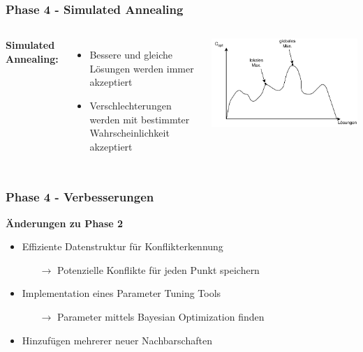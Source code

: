 \documentclass[aspectratio=169]{beamer}
\begin{document}
\begin{frame}
\frametitle{Phase 4 - Simulated Annealing}
\begin{columns}[c] %
	
	\textbf{Simulated Annealing:}
	\begin{itemize}
		\item Bessere und gleiche Lösungen werden immer akzeptiert
		\item Verschlechterungen werden mit bestimmter Wahrscheinlichkeit akzeptiert
	\end{itemize}
	\includegraphics[scale=.6]{sa_maximum.pdf}	
\end{columns}
\end{frame}

\begin{frame}
\frametitle{Phase 4 - Verbesserungen}
\textbf{Änderungen zu Phase 2}\\
\begin{itemize}
	\item Effiziente Datenstruktur für Konflikterkennung
	\begin{itemize}
		\item[$\rightarrow$] Potenzielle Konflikte für jeden Punkt speichern
	\end{itemize}
	\item Implementation eines Parameter Tuning Tools
	\begin{itemize}
		\item[$\rightarrow$] Parameter mittels Bayesian Optimization finden
	\end{itemize}
	\item Hinzufügen mehrerer neuer Nachbarschaften
\end{itemize}
\end{frame}
\end{document}
